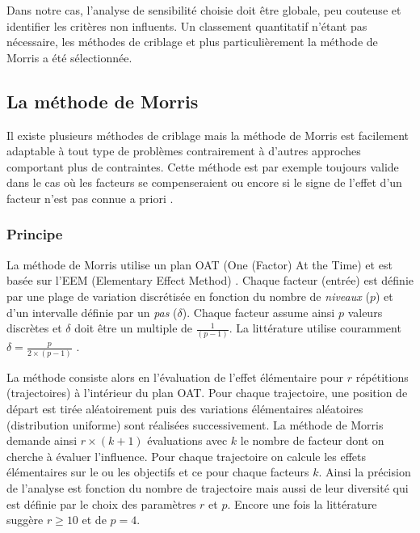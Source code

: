 Dans notre cas, l’analyse de sensibilité choisie doit être globale, peu couteuse
et identifier les critères non influents. Un classement quantitatif n’étant pas
nécessaire, les méthodes de criblage et plus particulièrement la méthode de Morris
a été sélectionnée.



\subsection{La méthode de Morris} %
\label{sub:la_methode_de_morris}

Il existe plusieurs méthodes de criblage mais la méthode de Morris \parencite{Morris1991161}
est facilement adaptable à tout type de problèmes contrairement à d’autres approches
comportant plus de contraintes. Cette méthode est par exemple toujours valide dans le cas où
les facteurs se compenseraient ou encore si le signe de l’effet d’un facteur n’est pas
connue a priori \parencite{Saltelli2004}.


\subsubsection{Principe} %
\label{ssub:principe}
La méthode de Morris utilise un plan OAT (One (Factor) At the Time) et est basée sur
l’EEM (Elementary Effect Method) \parencite{Saltelli2004}.
Chaque facteur (entrée) est définie par une plage de variation discrétisée en fonction
du nombre de \emph{niveaux} ($p$) et d’un intervalle définie par un \emph{pas} ($\delta$).
Chaque facteur assume ainsi $p$ valeurs discrètes et $\delta$ doit être un multiple de
$\frac{1}{(p - 1)}$. La littérature utilise couramment $\delta = \frac{p}{2 \times (p - 1)}$
\parencite{Morris1991161, Campolongo20071509}.

La méthode consiste alors en l’évaluation de l’effet élémentaire pour $r$ répétitions
(trajectoires) à l’intérieur du plan OAT. Pour chaque trajectoire, une position de départ
est tirée aléatoirement puis des variations élémentaires aléatoires (distribution uniforme)
sont réalisées successivement. La méthode de Morris demande ainsi $r \times (k + 1)$ évaluations
avec $k$ le nombre de facteur dont on cherche à évaluer l’influence. Pour chaque trajectoire
on calcule les effets élémentaires sur le ou les objectifs et ce pour chaque facteurs $k$.
Ainsi la précision de l’analyse est fonction du nombre de trajectoire mais aussi
de leur diversité qui est définie par le choix des paramètres $r$ et $p$.
Encore une fois la littérature suggère $r \geq 10$ et de $p = 4$.

